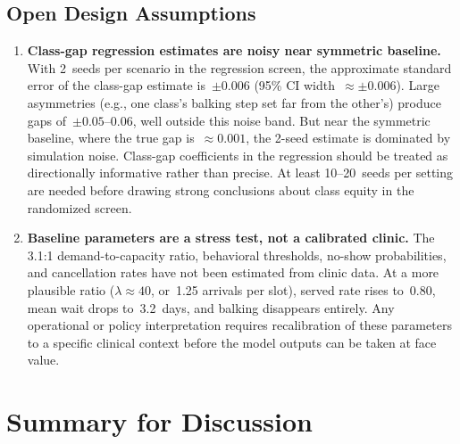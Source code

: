 \documentclass[11pt]{article}
\begin{document}
\subsection{Open Design Assumptions}

\vspace{6pt}
\begin{checkenv}
\begin{enumerate}[leftmargin=1.5em, itemsep=4pt]

\item \textbf{Class-gap regression estimates are noisy near symmetric baseline.}
With 2~seeds per scenario in the regression screen, the approximate standard
error of the class-gap estimate is~$\pm 0.006$ (95\% CI width~$\approx
\pm 0.006$). Large asymmetries (e.g., one class's balking step set far from
the other's) produce gaps of~$\pm 0.05$--$0.06$, well outside this noise
band. But near the symmetric baseline, where the true gap is~$\approx 0.001$,
the 2-seed estimate is dominated by simulation noise. Class-gap coefficients
in the regression should be treated as directionally informative rather than
precise. At least 10--20~seeds per setting are needed before drawing strong
conclusions about class equity in the randomized screen.

\item \textbf{Baseline parameters are a stress test, not a calibrated clinic.}
The 3.1:1 demand-to-capacity ratio, behavioral thresholds, no-show
probabilities, and cancellation rates have not been estimated from clinic
data. At a more plausible ratio ($\lambda \approx 40$, or~1.25 arrivals per
slot), served rate rises to~0.80, mean wait drops to~3.2~days, and balking
disappears entirely. Any operational or policy interpretation requires
recalibration of these parameters to a specific clinical context before the
model outputs can be taken at face value.

\end{enumerate}
\end{checkenv}

\section{Summary for Discussion}
\label{sec:summary}
\end{document}
